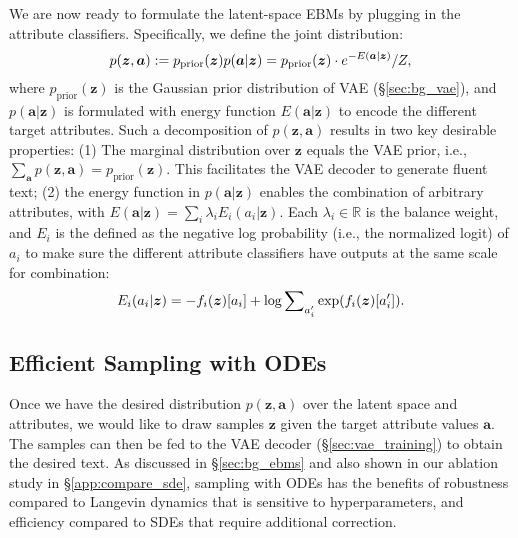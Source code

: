 \documentclass[11pt]{article}
\begin{document}
We are now ready to formulate the latent-space EBMs by plugging in the attribute classifiers. Specifically, we define the joint distribution:
\begin{equation}
\small
\setlength\abovedisplayskip{0.2cm}
\setlength\belowdisplayskip{0.2cm}
\label{eq:joint_dist}
    p(\bm z,\bm a) := p_{\text{prior}}(\bm z) p(\bm a | \bm z)  = p_{\text{prior}}(\bm z) \cdot e^{- E(\bm{a}|\bm z)} / Z,
\end{equation}
where $p_{\text{prior}}(\bm{z})$ is the Gaussian prior distribution of VAE (\S\ref{sec:bg_vae}), and $p(\bm{a}|\bm{z})$ is formulated with energy function $E(\bm{a}|\bm z)$ to encode the different target attributes. Such a decomposition of $p(\bm z, \bm a)$ results in two key desirable properties: (1)
The marginal distribution over $\bm{z}$ equals the VAE prior, i.e., $\sum_{\bm{a}} p(\bm{z}, \bm{a}) = p_{\text{prior}}(\bm{z})$. This facilitates the VAE decoder to generate fluent text;
(2) the energy function in $p(\bm a | \bm z)$ enables the combination of arbitrary attributes, with $E(\bm{a}|\bm z) = \sum_{i} \lambda_i E_i(a_i|\bm z)$. Each $\lambda_i \in \mathbb{R}$ is the balance weight, and $E_i$ is the defined as the negative log probability (i.e., the normalized logit) of $a_i$ to make sure the different attribute classifiers have outputs at the same scale for combination:
\begin{equation}
\small
\setlength\abovedisplayskip{0.2cm}
\setlength\belowdisplayskip{0.01cm}
\label{eq:cond_e_discrete}
    E_i(a_i|\bm z) = -{f_{i}(\bm z)}[a_i] + \log\sum\nolimits_{a'_i}\exp(f_{i}(\bm z)[a'_i]).
\end{equation}




















\subsection{Efficient Sampling with ODEs}
\label{sec:ode_sampler}
Once we have the desired distribution $p(\bm z, \bm a)$ over the latent space and attributes, we would like to draw samples $\bm{z}$ given the target attribute values $\bm{a}$. The samples can then be fed to the VAE decoder (\S\ref{sec:vae_training}) to obtain the desired text. As discussed in \S\ref{sec:bg_ebms} and also shown in our ablation study in \S\ref{app:compare_sde}, sampling with ODEs has the benefits of robustness compared to Langevin dynamics that is sensitive to hyperparameters, and efficiency compared to SDEs that require additional correction. 
\end{document}

